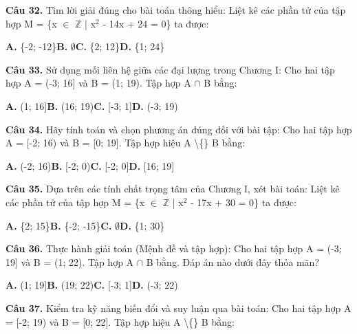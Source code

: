\documentclass[11pt,a4paper]{article}
\begin{document}
\textbf{\color{primary} Câu 32.} Tìm lời giải đúng cho bài toán thông hiểu: Liệt kê các phần tử của tập hợp M = \{x $\in$ $\mathbb{Z}$ | x$^2$ - 14x + 24 = 0\} ta được:\par
\hspace*{1.5em}\textbf{A.} \{-2; -12\}\quad\quad \textbf{B.} $\emptyset$\quad\quad \textbf{C.} \{2; 12\}\quad\quad \textbf{D.} \{1; 24\}\par\vspace{2pt}
\textbf{\color{primary} Câu 33.} Sử dụng mối liên hệ giữa các đại lượng trong Chương I: Cho hai tập hợp A = (-3; 16] và B = (1; 19). Tập hợp A $\cap$ B bằng:\par
\hspace*{1.5em}\textbf{A.} (1; 16]\quad\quad \textbf{B.} (16; 19)\quad\quad \textbf{C.} [-3; 1]\quad\quad \textbf{D.} (-3; 19)\par\vspace{2pt}
\textbf{\color{primary} Câu 34.} Hãy tính toán và chọn phương án đúng đối với bài tập: Cho hai tập hợp A = [-2; 16) và B = [0; 19]. Tập hợp hiệu A \textbackslash\{\} B bằng:\par
\hspace*{1.5em}\textbf{A.} (-2; 16)\quad\quad \textbf{B.} [-2; 0)\quad\quad \textbf{C.} [-2; 0]\quad\quad \textbf{D.} [16; 19]\par\vspace{2pt}
\textbf{\color{primary} Câu 35.} Dựa trên các tính chất trọng tâm của Chương I, xét bài toán: Liệt kê các phần tử của tập hợp M = \{x $\in$ $\mathbb{Z}$ | x$^2$ - 17x + 30 = 0\} ta được:\par
\hspace*{1.5em}\textbf{A.} \{2; 15\}\quad\quad \textbf{B.} \{-2; -15\}\quad\quad \textbf{C.} $\emptyset$\quad\quad \textbf{D.} \{1; 30\}\par\vspace{2pt}
\textbf{\color{primary} Câu 36.} Thực hành giải toán (Mệnh đề và tập hợp): Cho hai tập hợp A = (-3; 19] và B = (1; 22). Tập hợp A $\cap$ B bằng. Đáp án nào dưới đây thỏa mãn?\par
\hspace*{1.5em}\textbf{A.} (1; 19]\quad\quad \textbf{B.} (19; 22)\quad\quad \textbf{C.} [-3; 1]\quad\quad \textbf{D.} (-3; 22)\par\vspace{2pt}
\textbf{\color{primary} Câu 37.} Kiểm tra kỹ năng biến đổi và suy luận qua bài toán: Cho hai tập hợp A = [-2; 19) và B = [0; 22]. Tập hợp hiệu A \textbackslash\{\} B bằng:\par
\end{document}
